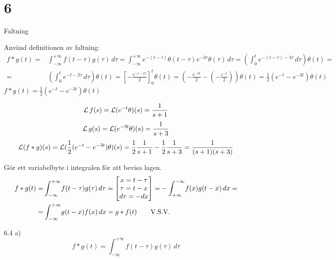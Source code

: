 \chapter{6}{Faltning}

\begin{task}{6.1}
	Använd definitionen av faltning:
	\begin{align*}
	f*g(t)=
	&\int_{-\infty}^{+\infty}\! f(t-\tau)g(\tau)\, d\tau=
	\int_{-\infty}^{+\infty}\! e^{-(t-\tau)}\theta(t-\tau)e^{-3\tau}\theta(\tau)\, d\tau=
	\left(\int_{0}^{t}\! e^{-(t-\tau)-3\tau}\, d\tau\right)\theta(t)= \\ =
	&\left(\int_{0}^{t}\! e^{-t-2\tau}\, d\tau\right)\theta(t)=
	\left[-\frac{e^{-t-2\tau}}{2}\right]_0^t\theta(t)=
	\left(-\frac{e^{-3t}}{2}-\left(-\frac{e^{-t}}{2}\right)\right)\theta(t)=
	\frac{1}{2}(e^{-t}-e^{-3t})\theta(t)
	\end{align*}
	\ans $f*g(t)=\frac{1}{2}(e^{-t}-e^{-3t})\theta(t)$
\end{task}

\begin{task}{6.2}
	\begin{align*}
	\operatorname{\mathcal{L}} f(s)=
	\operatorname{\mathcal{L}} (e^{-t}\theta)(s)=
	\frac{1}{s+1}
	\end{align*}
	\begin{align*}
	\operatorname{\mathcal{L}} g(s)=
	\operatorname{\mathcal{L}} (e^{-3t}\theta)(s)=
	\frac{1}{s+3}
	\end{align*}
	\begin{align*}
	\laplace (f*g)(s)=
	\laplace (\frac{1}{2}(e^{-t}-e^{-3t})\theta)(s)=
	\frac{1}{2}\*\frac{1}{s+1}-\frac{1}{2}\*\frac{1}{s+3}=
	\frac{1}{(s+1)(s+3)}
	\end{align*}
\end{task}

\begin{task}{6.3}
	Gör ett variabelbyte i integralen för att bevisa lagen.
	\begin{align*}
	f*g(t)=
	&\int_{-\infty}^{+\infty}\!f(t-\tau)g(\tau)\, d\tau=
	\begin{bmatrix}
	x=t-\tau \\
	\tau=t-x \\
	d\tau=-dx
	\end{bmatrix}=
	-\int_{+\infty}^{-\infty}\!f(x)g(t-x)\, dx= \\ =
	&\int_{-\infty}^{+\infty}\!g(t-x)f(x)\, dx=
	g*f(t)\text{\qquad V.S.V.}
	\end{align*}
\end{task}

\begin{task}{6.4 a)}
	\[f*g(t)=\int_{-\infty}^{+\infty}\!f(t-\tau)g(\tau)\, d\tau\]
\end{task}

